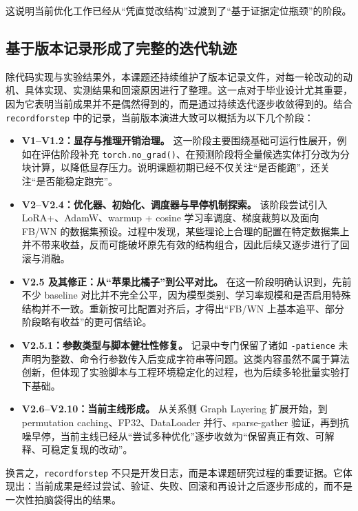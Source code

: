\documentclass[12pt,a4paper]{ctexart}
\begin{document}
这说明当前优化工作已经从“凭直觉改结构”过渡到了“基于证据定位瓶颈”的阶段。

\subsection{基于版本记录形成了完整的迭代轨迹}
除代码实现与实验结果外，本课题还持续维护了版本记录文件，对每一轮改动的动机、具体实现、实测结果和回滚原因进行了整理。这一点对于毕业设计尤其重要，因为它表明当前成果并不是偶然得到的，而是通过持续迭代逐步收敛得到的。结合 \texttt{recordforstep} 中的记录，当前版本演进大致可以概括为以下几个阶段：
\begin{itemize}
  \item \textbf{V1--V1.2：显存与推理开销治理。} 这一阶段主要围绕基础可运行性展开，例如在评估阶段补充 \texttt{torch.no\_grad()}、在预测阶段将全量候选实体打分改为分块计算，以降低显存压力。说明课题初期已经不仅关注“是否能跑”，还关注“是否能稳定跑完”。
  \item \textbf{V2--V2.4：优化器、初始化、调度器与早停机制探索。} 该阶段尝试引入 LoRA+、AdamW、warmup + cosine 学习率调度、梯度裁剪以及面向 FB/WN 的数据集预设。过程中发现，某些理论上合理的配置在特定数据集上并不带来收益，反而可能破坏原先有效的结构组合，因此后续又逐步进行了回滚与消融。
  \item \textbf{V2.5 及其修正：从“苹果比橘子”到公平对比。} 在这一阶段明确认识到，先前不少 baseline 对比并不完全公平，因为模型类别、学习率规模和是否启用特殊结构并不一致。重新按可比配置对齐后，才得出“FB/WN 上基本追平、部分阶段略有收益”的更可信结论。
  \item \textbf{V2.5.1：参数类型与脚本健壮性修复。} 记录中专门保留了诸如 \texttt{-patience} 未声明为整数、命令行参数传入后变成字符串等问题。这类内容虽然不属于算法创新，但体现了实验脚本与工程环境稳定化的过程，也为后续多轮批量实验打下基础。
  \item \textbf{V2.6--V2.10：当前主线形成。} 从关系侧 Graph Layering 扩展开始，到 permutation caching、FP32、DataLoader 并行、sparse-gather 验证，再到抗噪早停，当前主线已经从“尝试多种优化”逐步收敛为“保留真正有效、可解释、可稳定复现的改动”。
\end{itemize}

换言之，\texttt{recordforstep} 不只是开发日志，而是本课题研究过程的重要证据。它体现出：当前成果是经过尝试、验证、失败、回滚和再设计之后逐步形成的，而不是一次性拍脑袋得出的结果。
\end{document}

